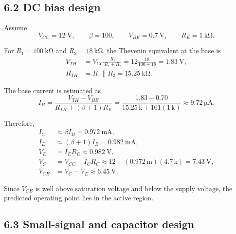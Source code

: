 \documentclass[11pt,a4paper]{article}
\begin{document}
\subsection*{6.2 DC bias design}

\begin{examplebox}
Assume
\[
V_{CC}=\SI{12}{\volt},\qquad
\beta=100,\qquad
V_{BE}=\SI{0.7}{\volt},\qquad
R_E=\SI{1}{\kilo\ohm}.
\]

For $R_1=\SI{100}{\kilo\ohm}$ and
$R_2=\SI{18}{\kilo\ohm}$, the Thevenin equivalent at the base is
\begin{align}
V_{TH}
 &=V_{CC}\frac{R_2}{R_1+R_2}
 =12\frac{18}{100+18}
 =\SI{1.83}{\volt},\\
R_{TH}
 &=R_1\parallel R_2
 =\SI{15.25}{\kilo\ohm}.
\end{align}

The base current is estimated as
\begin{equation}
I_B=
\frac{V_{TH}-V_{BE}}{R_{TH}+(\beta+1)R_E}
=
\frac{1.83-0.70}
{15.25\,\text{k}+101(1\,\text{k})}
\approx\SI{9.72}{\micro\ampere}.
\end{equation}

Therefore,
\begin{align}
I_C &\approx \beta I_B=\SI{0.972}{\milli\ampere},\\
I_E &\approx(\beta+1)I_B=\SI{0.982}{\milli\ampere},\\
V_E &=I_E R_E\approx\SI{0.982}{\volt},\\
V_C &=V_{CC}-I_C R_C
    \approx 12-(0.972\,\text{m})(4.7\,\text{k})
    =\SI{7.43}{\volt},\\
V_{CE}&=V_C-V_E\approx\SI{6.45}{\volt}.
\end{align}

Since $V_{CE}$ is well above saturation voltage and below the supply voltage,
the predicted operating point lies in the active region.
\end{examplebox}

\subsection*{6.3 Small-signal and capacitor design}
\end{document}
